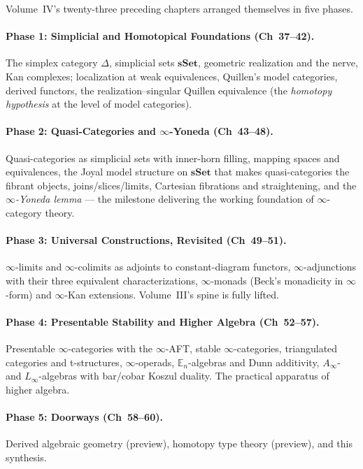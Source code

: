 Volume~IV's twenty-three preceding chapters arranged themselves in
five phases.

\paragraph{Phase 1: Simplicial and Homotopical Foundations (Ch~37--42).}
The simplex category $\Delta$, simplicial sets $\mathbf{sSet}$, geometric
realization and the nerve, Kan complexes; localization at weak
equivalences, Quillen's model categories, derived functors, the
realization–singular Quillen equivalence (the \emph{homotopy hypothesis}
at the level of model categories).

\paragraph{Phase 2: Quasi-Categories and $\infty$-Yoneda (Ch~43--48).}
Quasi-categories as simplicial sets with inner-horn filling, mapping
spaces and equivalences, the Joyal model structure on $\mathbf{sSet}$
that makes quasi-categories the fibrant objects, joins/slices/limits,
Cartesian fibrations and straightening, and the \emph{$\infty$-Yoneda
lemma} — the milestone delivering the working foundation of
$\infty$-category theory.

\paragraph{Phase 3: Universal Constructions, Revisited (Ch~49--51).}
$\infty$-limits and $\infty$-colimits as adjoints to constant-diagram
functors, $\infty$-adjunctions with their three equivalent characterizations,
$\infty$-monads (Beck's monadicity in $\infty$-form) and $\infty$-Kan
extensions. Volume~III's spine is fully lifted.

\paragraph{Phase 4: Presentable Stability and Higher Algebra (Ch~52--57).}
Presentable $\infty$-categories with the $\infty$-AFT, stable
$\infty$-categories, triangulated categories and t-structures,
$\infty$-operads, $\mathbb{E}_n$-algebras and Dunn additivity,
$A_\infty$- and $L_\infty$-algebras with bar/cobar Koszul duality.
The practical apparatus of higher algebra.

\paragraph{Phase 5: Doorways (Ch~58--60).}
Derived algebraic geometry (preview), homotopy type theory (preview),
and this synthesis.

